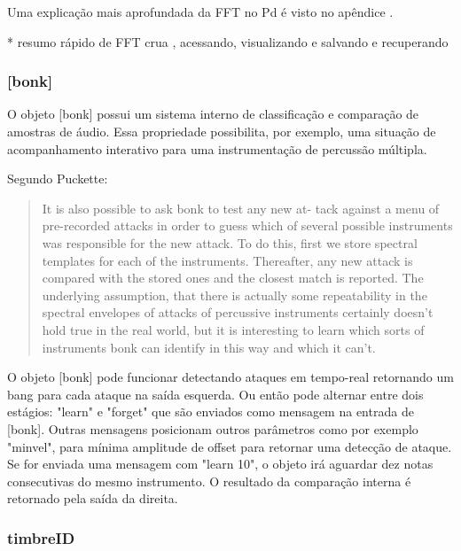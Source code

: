 \documentclass{ppgmus}
\begin{document}
Uma explicação mais aprofundada da FFT no Pd é visto no apêndice \label{fftpd}.

* resumo rápido de FFT crua , acessando, visualizando e salvando e recuperando

\subsubsection{[bonk\texttildelow]}


O objeto [bonk\texttildelow] possui um sistema interno de classificação
e comparação de amostras de áudio. Essa propriedade possibilita, por exemplo, 
uma situação de acompanhamento interativo para uma instrumentação de 
percussão múltipla.

Segundo Puckette:

\begin{quotation}
It is also possible to ask bonk to test any new at-
tack against a menu of pre-recorded attacks in order
to guess which of several possible instruments was
responsible for the new attack. To do this, first we
store spectral templates for each of the instruments.
Thereafter, any new attack is compared with the
stored ones and the closest match is reported. The
underlying assumption, that there is actually some
repeatability in the spectral envelopes of attacks of
percussive instruments certainly doesn't hold true in
the real world, but it is interesting to learn which
sorts of instruments bonk can identify in this way
and which it can't.
\end{quotation}

O objeto [bonk\texttildelow] pode funcionar detectando
ataques em tempo-real retornando um bang para cada ataque 
na saída esquerda. Ou então pode alternar entre dois estágios:
"learn" e "forget" que são enviados como mensagem na entrada de 
[bonk\texttildelow]. Outras mensagens posicionam outros
parâmetros como por exemplo "minvel", para mínima amplitude de offset
para retornar uma detecção de ataque.
Se for enviada uma mensagem com "learn 10",
o objeto irá aguardar dez notas consecutivas do mesmo instrumento.
O resultado da comparação interna é retornado pela saída da direita.



\subsubsection{timbreID}
\end{document}

